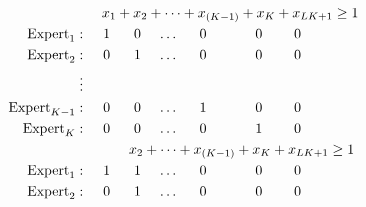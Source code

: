 \begin{align*}
     & \ \ \ \ x_{1} + x_{2} + \dots + x_{(K-1)} + x_{K} + x_{LK+1} \ge 1\\
\textnormal{Expert}_{1}: & \hspace{0.5cm} 1 \hspace{0.6cm} 0 \hspace{0.42cm} \dots \hspace{0.53cm} 0  \hspace{1.23cm} 0 \hspace{0.8cm} 0 \\
\textnormal{Expert}_{2}: & \hspace{0.5cm} 0 \hspace{0.6cm} 1 \hspace{0.42cm} \dots \hspace{0.53cm} 0  \hspace{1.23cm} 0 \hspace{0.8cm} 0 \\
     \vdots  & \\
\textnormal{Expert}_{K-1}: & \hspace{0.5cm} 0 \hspace{0.6cm} 0 \hspace{0.42cm} \dots \hspace{0.53cm} 1  \hspace{1.23cm} 0 \hspace{0.8cm} 0 \\
\textnormal{Expert}_{K}: & \hspace{0.5cm} 0 \hspace{0.6cm} 0 \hspace{0.42cm} \dots \hspace{0.53cm} 0  \hspace{1.23cm} 1 \hspace{0.8cm} 0 \\
     & \hspace{1.15cm} x_{2} + \dots + x_{(K-1)} + x_{K} + x_{LK+1} \ge 1\\
\textnormal{Expert}_{1}: & \hspace{0.5cm} 1 \hspace{0.6cm} 1 \hspace{0.42cm} \dots \hspace{0.53cm} 0  \hspace{1.23cm} 0 \hspace{0.8cm} 0 \\
\textnormal{Expert}_{2}: & \hspace{0.5cm} 0 \hspace{0.6cm} 1 \hspace{0.42cm} \dots \hspace{0.53cm} 0  \hspace{1.23cm} 0 \hspace{0.8cm} 0 \\

\end{align*}
